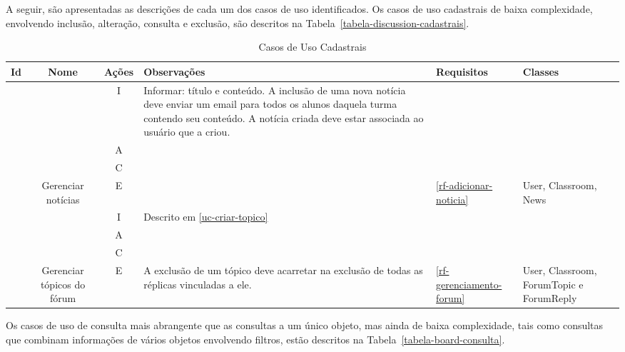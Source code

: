 A seguir, são apresentadas as descrições de cada um dos casos de uso identificados.  Os casos de uso cadastrais de baixa complexidade, envolvendo inclusão, alteração, consulta e exclusão, são descritos na Tabela~\ref{tabela-discussion-cadastrais}.

\newpage

\begin{longtable}{|c|c|c|p{6.3cm}|p{1.2cm}|p{2cm}|}
	\caption{Casos de Uso Cadastrais}\\
	\hline  \rowcolor[rgb]{0.8,0.8,0.8}
	
	Id & Nome  &  Ações  &  Observações & Requisitos   & Classes  \\ 	\hline \hline
	\endhead
	\hline
	\endlastfoot
	
	{}  &  {}  &  I   &  Informar: título e conteúdo. A inclusão de uma nova notícia deve enviar um email para todos os alunos daquela turma contendo seu conteúdo. A notícia criada deve estar associada ao usuário que a criou. &   {}   & {}    \\\cline{3-4}
	{}  &  {}  &  A   &  {}   &   {}   &  {}  \\ \cline{3-4}
	{}  &  {}  &  C  &   {}   &   {}  &   {}    \\\cline{3-4}
	\multirow{-7}{*}{\UC\label{uc-gerenciar-noticias}}   &  \multirow{-7}{*}{\parbox{2cm}{Gerenciar notícias}}   &    E    &   {}   &  \multirow{-7}{1.5cm}{\ref{rf-adicionar-noticia}}  & \multirow{-7}{2cm}{User, Classroom, News} \\ \hline
	
	{}  &  {}  &  I   & Descrito em  \ref{uc-criar-topico} &   {}   & {}    \\\cline{3-4}
	{}  &  {}  &  A   &  {}   &   {}   &  {}  \\ \cline{3-4}
	{}  &  {}  &  C  &   {}   &   {}  &   {}    \\\cline{3-4}
	\multirow{-3}{*}{\UC\label{uc-gerenciar-topicos}}   &  \multirow{-3}{*}{\parbox{2cm}{Gerenciar tópicos do fórum}}   &    E    &   A exclusão de um tópico deve acarretar na exclusão de todas as réplicas vinculadas a ele.   &  \multirow{-3}{1.5cm}{\ref{rf-gerenciamento-forum}}  & \multirow{-3}{2cm}{User, Classroom, ForumTopic e ForumReply} 
	
	\label{tabela-discussion-cadastrais}
\end{longtable}


Os casos de uso de consulta mais abrangente que as consultas a um único objeto, mas ainda de baixa complexidade, tais como consultas que combinam informações de vários objetos envolvendo filtros, estão descritos na Tabela~\ref{tabela-board-consulta}.

